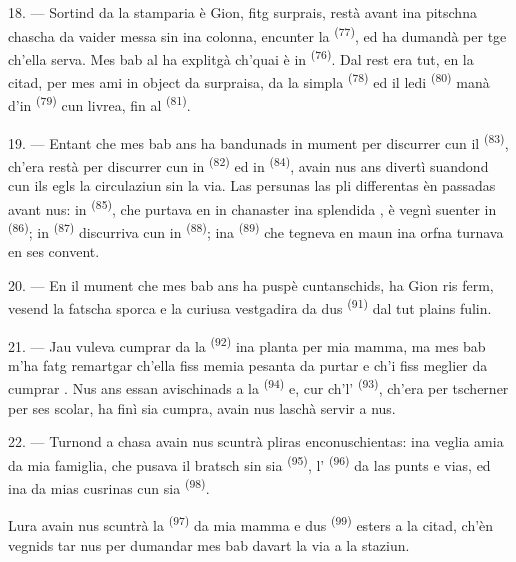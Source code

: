 \VUsaut{3.0mm}

18. --- Sortind da la stamparia è Gion, fitg surprais, restà avant ina pitschna
chascha da vaider messa sin ina colonna, encunter la 
\textsuperscript{(77)}, ed ha dumandà per tge ch'ella serva. Mes bab al ha explitgà
ch'quai è in  \textsuperscript{(76)}. Dal rest era tut, en la
citad, per mes ami in object da surpraisa, da la simpla 
\textsuperscript{(78)} ed il ledi  \textsuperscript{(80)} manà d'in
 \textsuperscript{(79)} cun livrea, fin al 
\textsuperscript{(81)}.

19. --- Entant che mes bab ans ha bandunads in mument per discurrer cun il
 \textsuperscript{(83)}, ch'era restà per discurrer cun in 
\textsuperscript{(82)} ed in  \textsuperscript{(84)}, avain nus ans divertì
suandond cun ils egls la circulaziun sin la via. Las persunas las pli differentas èn
passadas avant nus: in  \textsuperscript{(85)}, che purtava en
in chanaster ina splendida , è vegnì suenter in  \textsuperscript{(86)}; in 
\textsuperscript{(87)} discurriva cun in  \textsuperscript{(88)}; ina
 \textsuperscript{(89)} che tegneva en maun ina orfna turnava en ses
convent.

\VUsaut{3.0mm}

20. --- En il mument che mes bab ans ha puspè cuntanschids, ha Gion ris ferm, vesend
la fatscha sporca e la curiusa vestgadira da dus 
\textsuperscript{(91)} dal tut plains fulin.

21. --- Jau vuleva cumprar da la  \textsuperscript{(92)} ina
planta per mia mamma, ma mes bab m'ha fatg remartgar ch'ella fiss memia pesanta da
purtar e ch'i fiss meglier da cumprar . Nus ans essan avischinads a la
 \textsuperscript{(94)} e, cur ch'l' \textsuperscript{(93)},
ch'era per tscherner per ses scolar, ha finì sia cumpra, avain nus laschà servir a
nus.

22. --- Turnond a chasa avain nus scuntrà pliras enconuschientas: ina veglia amia da
mia famiglia, che pusava il bratsch sin sia 
\textsuperscript{(95)}, l' \textsuperscript{(96)} da las punts e vias, ed
ina da mias cusrinas cun sia  \textsuperscript{(98)}.

Lura avain nus scuntrà la  \textsuperscript{(97)} da mia mamma e dus
 \textsuperscript{(99)} esters a la citad, ch'èn vegnids tar nus per dumandar
mes bab davart la via a la staziun.

\VUsaut{6.0mm}
\VUfilet{22mm}
